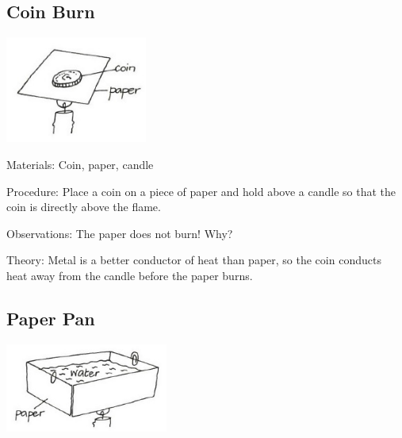 \begin{multicols}{2}
\subsection{Coin Burn}

\begin{center}
\includegraphics[width=0.35\textwidth]{./img/vso/coin-burn.jpg}
\end{center}

\begin{description*}
\item[Materials:]{Coin, paper, candle}
\item[Procedure:]{Place a coin on a piece of paper and hold above a candle so that the coin is directly above the flame.}
\item[Observations:]{The paper does not burn! Why?}
\item[Theory:]{Metal is a better conductor of heat than paper, so the coin conducts heat away from the candle before the paper burns.}
\end{description*}

\subsection{Paper Pan}

\begin{center}
\includegraphics[width=0.4\textwidth]{./img/vso/paper-pan.jpg}
\end{center}


\end{multicols}
